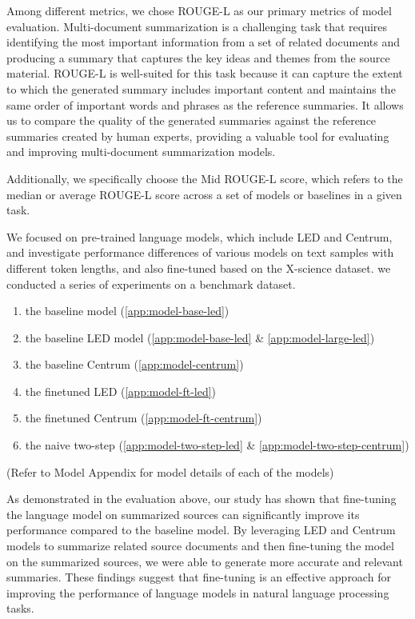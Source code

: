\documentclass[12pt, twocolumn]{article}
\numberwithin{equation}{section}
\begin{document}
Among different metrics, we chose ROUGE-L as our primary metrics of model evaluation. Multi-document summarization is a challenging task that requires identifying the most important information from a set of related documents and producing a summary that captures the key ideas and themes from the source material. ROUGE-L is well-suited for this task because it can capture the extent to which the generated summary includes important content and maintains the same order of important words and phrases as the reference summaries. It allows us to compare the quality of the generated summaries against the reference summaries created by human experts, providing a valuable tool for evaluating and improving multi-document summarization models.

Additionally, we specifically choose the Mid ROUGE-L score, which refers to the median or average ROUGE-L score across a set of models or baselines in a given task.

We focused on pre-trained language models, which include LED and Centrum, and investigate performance differences of various models on text samples with different token lengths, and also fine-tuned based on the X-science dataset.  we conducted a series of experiments on a benchmark dataset.

\begin{enumerate}
    \item the baseline model (\ref{app:model-base-led})
    \item the baseline LED model (\ref{app:model-base-led} \& \ref{app:model-large-led})
    \item the baseline Centrum (\ref{app:model-centrum})
    \item the finetuned LED (\ref{app:model-ft-led})
    \item the finetuned Centrum (\ref{app:model-ft-centrum})
    \item the naive two-step (\ref{app:model-two-step-led} \& \ref{app:model-two-step-centrum})
\end{enumerate}
(Refer to Model Appendix for model details of each of the models)

As demonstrated in the evaluation above, our study has shown that fine-tuning the language model on summarized sources can significantly improve its performance compared to the baseline model. By leveraging LED and Centrum models to summarize related source documents and then fine-tuning the model on the summarized sources, we were able to generate more accurate and relevant summaries. These findings suggest that fine-tuning is an effective approach for improving the performance of language models in natural language processing tasks.
\end{document}

